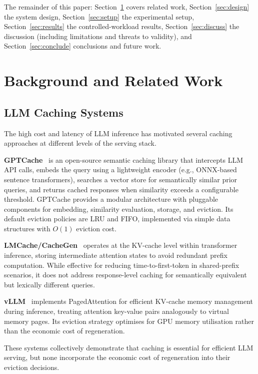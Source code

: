 \documentclass[sigconf, nonacm, review=false, screen=true]{acmart}
\begin{document}
The remainder of this paper: Section~\ref{sec:related} covers related work,
Section~\ref{sec:design} the system design,
Section~\ref{sec:setup} the experimental setup, Section~\ref{sec:results}
the controlled-workload results,
Section~\ref{sec:discuss} the discussion (including limitations and
threats to validity), and Section~\ref{sec:conclude} conclusions and
future work.

\section{Background and Related Work}
\label{sec:related}

\subsection{LLM Caching Systems}
The high cost and latency of LLM inference has motivated several caching
approaches at different levels of the serving stack.

\textbf{GPTCache}~\cite{gptcache} is an open-source semantic caching
library that intercepts LLM API calls, embeds the query using a
lightweight encoder (e.g., ONNX-based sentence transformers), searches a
vector store for semantically similar prior queries, and returns cached
responses when similarity exceeds a configurable threshold. GPTCache
provides a modular architecture with pluggable components for embedding,
similarity evaluation, storage, and eviction. Its default eviction
policies are LRU and FIFO, implemented via simple data structures with
$O(1)$ eviction cost.

\textbf{LMCache/CacheGen}~\cite{cachegen} operates at the KV-cache level
within transformer inference, storing intermediate attention states to
avoid redundant prefix computation. While effective for reducing
time-to-first-token in shared-prefix scenarios, it does not address
response-level caching for semantically equivalent but lexically different
queries.

\textbf{vLLM}~\cite{vllm} implements PagedAttention for efficient KV-cache
memory management during inference, treating attention key-value pairs
analogously to virtual memory pages. Its eviction strategy optimises for
GPU memory utilisation rather than the economic cost of regeneration.

These systems collectively demonstrate that caching is essential for
efficient LLM serving, but none incorporate the economic cost of
regeneration into their eviction decisions.
\end{document}
